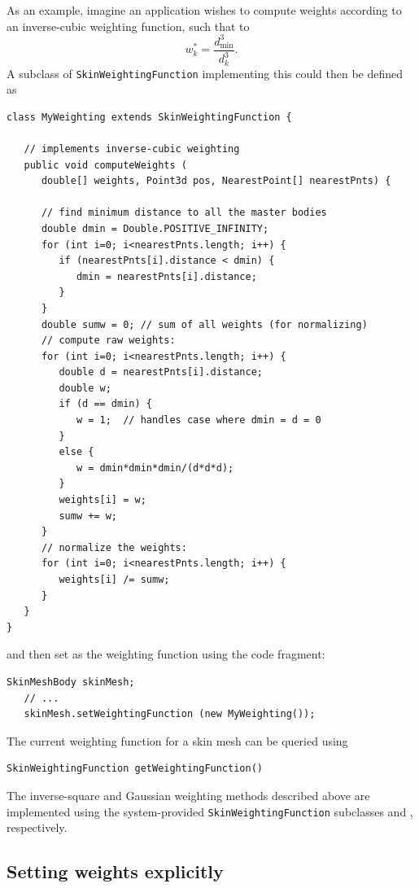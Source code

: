 As an example, imagine an application wishes to compute weights
according to an inverse-cubic weighting function, such that
to
%
\begin{equation*}
w_k^* = \frac{d_\text{min}^3}{d_k^3}.
\end{equation*}
%
A subclass of {\tt SkinWeightingFunction} implementing this
could then be defined as
%
\begin{lstlisting}[]
class MyWeighting extends SkinWeightingFunction {
      
   // implements inverse-cubic weighting
   public void computeWeights (
      double[] weights, Point3d pos, NearestPoint[] nearestPnts) {

      // find minimum distance to all the master bodies
      double dmin = Double.POSITIVE_INFINITY;
      for (int i=0; i<nearestPnts.length; i++) {
         if (nearestPnts[i].distance < dmin) {
            dmin = nearestPnts[i].distance;
         }
      }
      double sumw = 0; // sum of all weights (for normalizing)
      // compute raw weights:
      for (int i=0; i<nearestPnts.length; i++) {
         double d = nearestPnts[i].distance;
         double w;
         if (d == dmin) {
            w = 1;  // handles case where dmin = d = 0
         }
         else {
            w = dmin*dmin*dmin/(d*d*d);
         }
         weights[i] = w;
         sumw += w;
      }
      // normalize the weights:
      for (int i=0; i<nearestPnts.length; i++) {
         weights[i] /= sumw;
      }
   }
}
\end{lstlisting}
and then set as the weighting function using the code fragment:
%
\begin{lstlisting}[]
   SkinMeshBody skinMesh;
   // ...
   skinMesh.setWeightingFunction (new MyWeighting());
\end{lstlisting}
%

The current weighting function for a skin mesh can be
queried using
%
\begin{lstlisting}[]
   SkinWeightingFunction getWeightingFunction()
\end{lstlisting}
%
The inverse-square and Gaussian weighting methods described above are
implemented using the system-provided {\tt SkinWeightingFunction}
subclasses
 and
, respectively.

\subsection{Setting weights explicitly}

